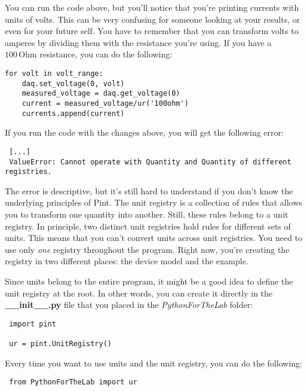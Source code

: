 You can run the code above, but you'll notice that you're printing currents with units of volts. This can be very confusing for someone looking at your results, or even for your future self. You have to remember that you can transform volts to amperes by dividing them with the resistance you're using. If you have a $100\,\textrm{Ohm}$ resistance, you can do the following:

\begin{verbatim}
for volt in volt_range:
    daq.set_voltage(0, volt)
    measured_voltage = daq.get_voltage(0)
    current = measured_voltage/ur('100ohm')
    currents.append(current)
\end{verbatim}

If you run the code with the changes above, you will get the following error:

\begin{verbatim}
 [...]
 ValueError: Cannot operate with Quantity and Quantity of different registries.
\end{verbatim}

The error is descriptive, but it's still hard to understand if you don't know the underlying principles of Pint. The unit registry is a collection of rules that allows you to transform one quantity into another. Still, these rules belong to a unit registry. In principle, two distinct unit registries hold rules for different sets of units. This means that you can't convert units across unit registries. You need to use only \emph{one} registry throughout the program. Right now, you're creating the registry in two different places: the device model and the example.

Since units belong to the entire program, it might be a good idea to define the unit registry at the root. In other words, you can create it directly in the \textbf{\_\_init\_\_.py} file that you placed in the \emph{PythonForTheLab} folder:

\begin{verbatim}
 import pint

 ur = pint.UnitRegistry()
\end{verbatim}

Every time you want to use units and the unit registry, you can do the following:

\begin{verbatim}
 from PythonForTheLab import ur
\end{verbatim}


